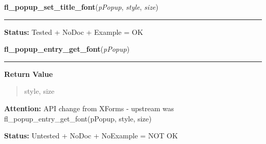     \label{xformslib:library:fl_popup_set_title_font}

    \vspace{0.5ex}

\hspace{.8\funcindent}\begin{boxedminipage}{\funcwidth}

    \raggedright \textbf{fl\_popup\_set\_title\_font}(\textit{pPopup}, \textit{style}, \textit{size})

    \vspace{-1.5ex}

    \rule{\textwidth}{0.5\fboxrule}
\setlength{\parskip}{2ex}
\setlength{\parskip}{1ex}
\textbf{Status:} Tested + NoDoc + Example = OK



    \end{boxedminipage}

    \label{xformslib:library:fl_popup_entry_get_font}

    \vspace{0.5ex}

\hspace{.8\funcindent}\begin{boxedminipage}{\funcwidth}

    \raggedright \textbf{fl\_popup\_entry\_get\_font}(\textit{pPopup})

    \vspace{-1.5ex}

    \rule{\textwidth}{0.5\fboxrule}
\setlength{\parskip}{2ex}
\setlength{\parskip}{1ex}
      \textbf{Return Value}
    \vspace{-1ex}

      \begin{quote}
      style, size

      \end{quote}

\textbf{Attention:} API change from XForms - upstream was fl\_popup\_entry\_get\_font(pPopup, 
style, size)



\textbf{Status:} Untested + NoDoc + NoExample = NOT OK



    \end{boxedminipage}

